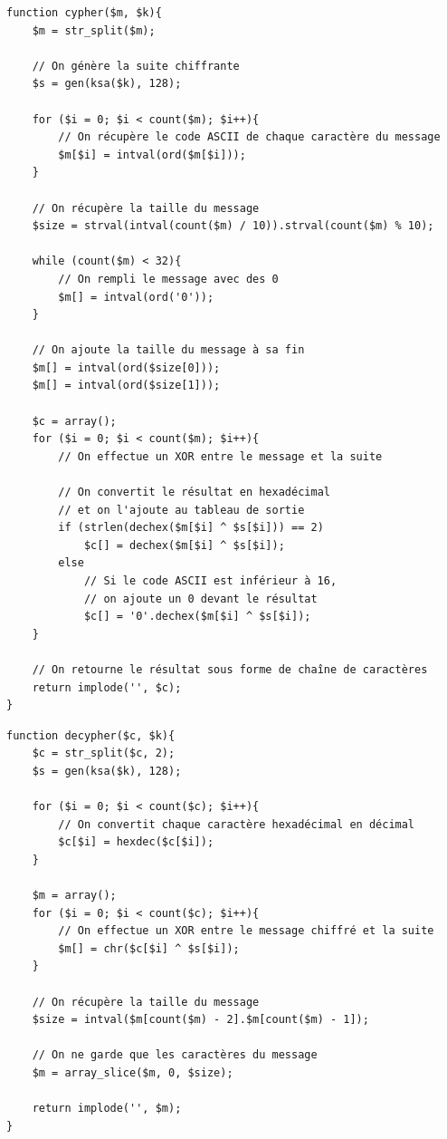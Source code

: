 \documentclass[12pt, a4paper]{article}
\begin{document}
\begin{lstlisting}[name=Fonction de chiffrement]
function cypher($m, $k){
    $m = str_split($m);
    
    // On génère la suite chiffrante
    $s = gen(ksa($k), 128);

    for ($i = 0; $i < count($m); $i++){
        // On récupère le code ASCII de chaque caractère du message
        $m[$i] = intval(ord($m[$i]));
    }

    // On récupère la taille du message
    $size = strval(intval(count($m) / 10)).strval(count($m) % 10);

    while (count($m) < 32){
        // On rempli le message avec des 0
        $m[] = intval(ord('0'));
    }
    
    // On ajoute la taille du message à sa fin
    $m[] = intval(ord($size[0]));
    $m[] = intval(ord($size[1]));

    $c = array();
    for ($i = 0; $i < count($m); $i++){
        // On effectue un XOR entre le message et la suite

        // On convertit le résultat en hexadécimal
        // et on l'ajoute au tableau de sortie
        if (strlen(dechex($m[$i] ^ $s[$i])) == 2)
            $c[] = dechex($m[$i] ^ $s[$i]);
        else
            // Si le code ASCII est inférieur à 16,
            // on ajoute un 0 devant le résultat
            $c[] = '0'.dechex($m[$i] ^ $s[$i]);
    }

    // On retourne le résultat sous forme de chaîne de caractères
    return implode('', $c);
}
\end{lstlisting}

\begin{lstlisting}[name=Fonction de déchiffrement]
function decypher($c, $k){
    $c = str_split($c, 2);
    $s = gen(ksa($k), 128);

    for ($i = 0; $i < count($c); $i++){
        // On convertit chaque caractère hexadécimal en décimal
        $c[$i] = hexdec($c[$i]);
    }

    $m = array();
    for ($i = 0; $i < count($c); $i++){
        // On effectue un XOR entre le message chiffré et la suite
        $m[] = chr($c[$i] ^ $s[$i]);
    }

    // On récupère la taille du message
    $size = intval($m[count($m) - 2].$m[count($m) - 1]);

    // On ne garde que les caractères du message
    $m = array_slice($m, 0, $size);

    return implode('', $m);
}
\end{lstlisting}
\end{document}
